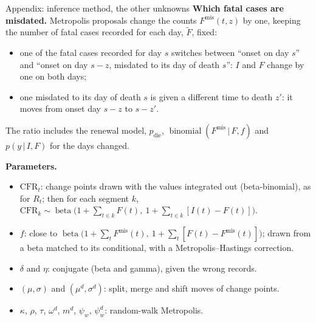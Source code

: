 \documentclass[aspectratio=169,9pt]{beamer}
\newcommand{\given}{\,|\,}
\newcommand{\bin}{\operatorname{binomial}}
\newcommand{\cfr}{\mathrm{CFR}}
\begin{document}
\begin{frame}{Appendix: inference method, the other unknowns}
\textbf{Which fatal cases are misdated.} Metropolis proposals change the
counts $F^{\mathrm{mis}}(t,z)$ by one, keeping the number of fatal cases
recorded for each day, $\tilde{F}$, fixed:
\begin{itemize}
\item one of the fatal cases recorded for day $s$ switches between ``onset on
day $s$'' and ``onset on day $s-z$, misdated to its day of death $s$'': $I$ and
$F$ change by one on both days;
\item one misdated to its day of death $s$ is given a different time to death
$z'$: it moves from onset day $s-z$ to $s-z'$.
\end{itemize}
The ratio includes the renewal model, $p_{\text{die}}$, $\bin(F^{\mathrm{mis}}\given F,f)$ and
$p(y\given I,F)$ for the days changed.

\medskip
\textbf{Parameters.}
\begin{itemize}
\item $\cfr_t$: change points drawn with the values integrated out
(beta-binomial), as for $R_t$; then for each segment $k$,
$\cfr_k\sim\operatorname{beta}\bigl(1+\sum_{t\in k}F(t),\ 1+\sum_{t\in k}[I(t)-F(t)]\bigr)$.
\item $f$: close to $\operatorname{beta}\bigl(1+\sum_tF^{\mathrm{mis}}(t),\
1+\sum_t[F(t)-F^{\mathrm{mis}}(t)]\bigr)$; drawn from a beta matched to its conditional,
with a Metropolis--Hastings correction.
\item $\delta$ and $\eta$: conjugate (beta and gamma), given the wrong records.
\item $(\mu,\sigma)$ and $(\mu^{d},\sigma^{d})$: split, merge and shift moves
of change points.
\item $\kappa$, $\rho$, $\tau$, $\omega^{d}$, $m^{d}$, $\psi_w$, $\psi^{d}_w$:
random-walk Metropolis.
\end{itemize}
\end{frame}
\end{document}
